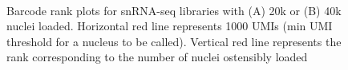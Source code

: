 \documentclass{article}
\begin{document}
\begin{figure}
	\\
	\caption{Barcode rank plots for snRNA-seq libraries with (A) 20k or (B) 40k nuclei loaded. Horizontal red line represents 1000 UMIs (min UMI threshold for a nucleus to be called). Vertical red line represents the rank corresponding to the number of nuclei ostensibly loaded}
\end{figure}
\end{document}
